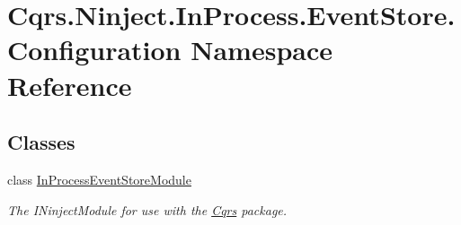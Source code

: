 \hypertarget{namespaceCqrs_1_1Ninject_1_1InProcess_1_1EventStore_1_1Configuration}{}\section{Cqrs.\+Ninject.\+In\+Process.\+Event\+Store.\+Configuration Namespace Reference}
\label{namespaceCqrs_1_1Ninject_1_1InProcess_1_1EventStore_1_1Configuration}
\subsection*{Classes}
\begin{DoxyCompactItemize}
\item 
class \hyperlink{classCqrs_1_1Ninject_1_1InProcess_1_1EventStore_1_1Configuration_1_1InProcessEventStoreModule}{In\+Process\+Event\+Store\+Module}
\begin{DoxyCompactList}\small\item\em The I\+Ninject\+Module for use with the \hyperlink{namespaceCqrs}{Cqrs} package. \end{DoxyCompactList}\end{DoxyCompactItemize}
